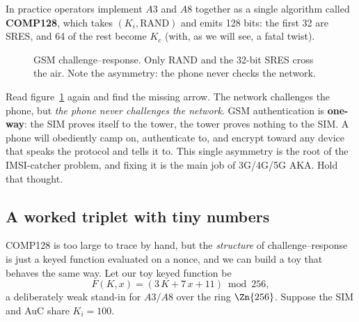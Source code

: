 In practice operators implement $A3$ and $A8$ together as a single algorithm called \textbf{COMP128}, which takes $(K_i, \text{RAND})$ and emits 128 bits: the first 32 are SRES, and 64 of the rest become $K_c$ (with, as we will see, a fatal twist).

\begin{figure}[H]
\centering
{}
\caption{GSM challenge--response. Only RAND and the 32-bit SRES cross the air. Note the asymmetry: the phone never checks the network.}
\label{ch29:fig-gsm-auth}
\end{figure}

\begin{trapbox}
Read figure~\ref{ch29:fig-gsm-auth} again and find the missing arrow. The network challenges the phone, but \emph{the phone never challenges the network}. GSM authentication is \textbf{one-way}: the SIM proves itself to the tower, the tower proves nothing to the SIM. A phone will obediently camp on, authenticate to, and encrypt toward any device that speaks the protocol and tells it to. This single asymmetry is the root of the IMSI-catcher problem, and fixing it is the main job of 3G/4G/5G AKA. Hold that thought.
\end{trapbox}

\subsection{A worked triplet with tiny numbers}
\label{ch29:gsm-toy}

COMP128 is too large to trace by hand, but the \emph{structure} of challenge--response is just a keyed function evaluated on a nonce, and we can build a toy that behaves the same way. Let our toy keyed function be
\[
  F(K,x) = (3\,K + 7\,x + 11) \bmod 256,
\]
a deliberately weak stand-in for $A3/A8$ over the ring $\Zn{256}$. Suppose the SIM and AuC share $K_i = 100$.


